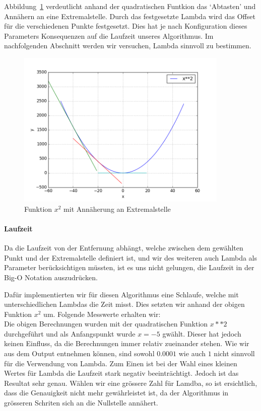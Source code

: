 \documentclass[10pt]{article}         %
\begin{document}
Abbildung~\ref{gradientx} verdeutlicht anhand der quadratischen Funtkion das `Abtasten' und Annähern an eine Extremalstelle. Durch das festgesetzte Lambda wird das Offset für die verschiedenen Punkte festgesetzt. Dies hat je nach Konfiguration dieses Parameters Konsequenzen auf die Laufzeit unseres Algorithmus. Im nachfolgenden Abschnitt werden wir versuchen, Lambda sinnvoll zu bestimmen.

\begin{figure}[!ht]
    \centering
    \includegraphics[width=0.9\textwidth]{gradient}
    \caption{Funktion $x^2$ mit Annäherung an Extremalstelle}\label{gradientx}
\end{figure}

\paragraph{Laufzeit}
Da die Laufzeit von der Entfernung abhängt, welche zwischen dem gewählten Punkt und der Extremalstelle definiert ist, und wir des weiteren auch Lambda als Parameter berücksichtigen müssten, ist es uns nicht gelungen, die Laufzeit in der Big-O Notation auszudrücken.

Dafür implementierten wir für diesen Algorithmus eine Schlaufe, welche mit unterschiedlichen Lambdas die Zeit misst. Dies setzten wir anhand der obigen Funktion $x^2$ um. Folgende Messwerte erhalten wir:\\




Die obigen Berechnungen wurden mit der quadratischen Funktion $x**2$ durchgeführt und als Anfangspunkt wurde $x=-5$ gwählt. Dieser hat jedoch keinen Einfluss, da die Berechnungen immer relativ zueinander stehen. 
Wie wir aus dem Output entnehmen können, sind sowohl $0.0001$ wie auch $1$ nicht sinnvoll für die Verwendung von Lambda. Zum Einen ist bei der Wahl eines kleinen Wertes für Lambda die Laufzeit stark negativ beeinträchtigt. Jedoch ist das Resultat sehr genau. Wählen wir eine grössere Zahl für Lamdba, so ist ersichtlich, dass die Genauigkeit nicht mehr gewährleistet ist, da der Algorithmus in grösseren Schriten sich an die Nullstelle annähert. 
\end{document}
